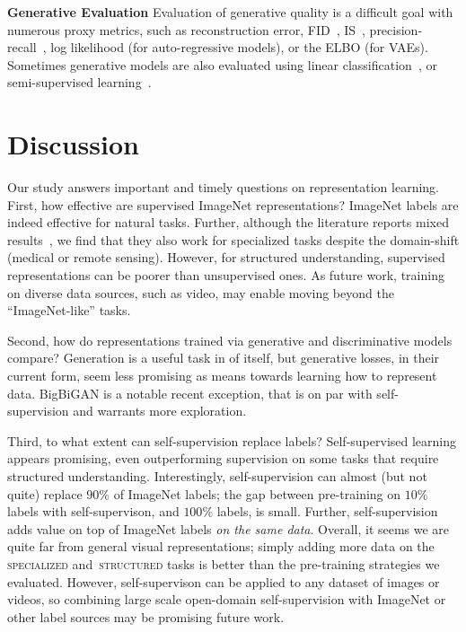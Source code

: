 \documentclass{article}
\newcommand{\myparagraph}[1]{\noindent\textbf{#1}\quad}
\DeclareRobustCommand{\taskSpecialized}{\raisebox{0.5pt}{\tikz{\fill[specialized] (0,0) circle (.5ex);}}\,\textsc{specialized}}
\DeclareRobustCommand{\taskStructured}{\raisebox{0.5pt}{\tikz{\fill[structured] (0,0) circle (.5ex);}}\,\textsc{structured}}
\newcommand{\imagenet}{ImageNet}
\begin{document}
\myparagraph{Generative Evaluation}
Evaluation of generative quality is a difficult goal with numerous proxy metrics, such as reconstruction error, FID~\citep{heusel2017gans}, IS~\citep{salimans2016improved}, precision-recall~\citep{sajjadi2018assessing}, log likelihood (for auto-regressive models), or the ELBO (for VAEs).
Sometimes generative models are also evaluated using linear classification~\citep{radford2016,donahue2016adversarial,dumoulin2016adversarially}, or semi-supervised learning~\citep{kingma2014semi, narayanaswamy2017learning,tschannen2018recent}.


\section{Discussion}
Our study answers important and timely questions on representation learning.
First, how effective are supervised \imagenet{} representations?
\imagenet{} labels are indeed effective for natural tasks.
Further, although the literature reports mixed results~\citep{liu2017detecting,raghu2019,neumann2019domain}, we find that they also work for specialized tasks despite the domain-shift (medical or remote sensing).
However, for structured understanding, supervised representations can be poorer than unsupervised ones.
As future work, training on diverse data sources, such as video, may enable moving beyond the ``\imagenet{}-like'' tasks.

Second, how do representations trained via generative and discriminative models compare?
Generation is a useful task in of itself, but generative losses, in their current form, seem less promising as means towards learning how to represent data.
BigBiGAN is a notable recent exception, that is on par with self-supervision and warrants more exploration.

Third, to what extent can self-supervision replace labels?
Self-supervised learning appears promising, even outperforming supervision on some tasks that require structured understanding.
Interestingly, self-supervision can almost (but not quite) replace $90\%$ of \imagenet{} labels; the gap between pre-training on $10\%$ labels with self-supervison, and $100\%$ labels, is small.
Further, self-supervision adds value on top of \imagenet{} labels \emph{on the same data}.
Overall, it seems we are quite far from general visual representations;
simply adding more data on the \taskSpecialized{} and \taskStructured{} tasks is better than the pre-training strategies we evaluated.
However, self-supervison can be applied to any dataset of images or videos, so combining large scale open-domain self-supervision with \imagenet{} or other label sources may be promising future work.
\end{document}
